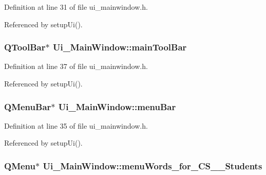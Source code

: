 Definition at line 31 of file ui\-\_\-mainwindow.\-h.



Referenced by setup\-Ui().

\hypertarget{class_ui___main_window_a5172877001c8c7b4e0f6de50421867d1}{
\subsubsection[{main\-Tool\-Bar}]{\setlength{\rightskip}{0pt plus 5cm}Q\-Tool\-Bar$\ast$ Ui\-\_\-\-Main\-Window\-::main\-Tool\-Bar}}\label{class_ui___main_window_a5172877001c8c7b4e0f6de50421867d1}


Definition at line 37 of file ui\-\_\-mainwindow.\-h.



Referenced by setup\-Ui().

\hypertarget{class_ui___main_window_a2be1c24ec9adfca18e1dcc951931457f}{
\subsubsection[{menu\-Bar}]{\setlength{\rightskip}{0pt plus 5cm}Q\-Menu\-Bar$\ast$ Ui\-\_\-\-Main\-Window\-::menu\-Bar}}\label{class_ui___main_window_a2be1c24ec9adfca18e1dcc951931457f}


Definition at line 35 of file ui\-\_\-mainwindow.\-h.



Referenced by setup\-Ui().

\hypertarget{class_ui___main_window_a7f4ea012695a9e61eb752b30df4caa38}{
\subsubsection[{menu\-Words\-\_\-for\-\_\-\-C\-S\-\_\-340\-\_\-\-Students}]{\setlength{\rightskip}{0pt plus 5cm}Q\-Menu$\ast$ Ui\-\_\-\-Main\-Window\-::menu\-Words\-\_\-for\-\_\-\-C\-S\-\_\-\_\-\-Students}}\label{class_ui___main_window_a7f4ea012695a9e61eb752b30df4caa38}


